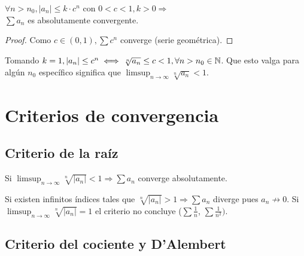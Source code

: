 \begin{corollary}
  $\forall n > n_0, |a_n| \leq k \cdot c^n$ con $0 < c < 1, k > 0 \Rightarrow$ \\
  $\sum a_n$ es absolutamente convergente.
  \begin{proof}
    Como $c \in (0, 1), \sum c^n$ converge (serie geométrica).
  \end{proof}
\end{corollary}

\begin{note}
  Tomando $k = 1, |a_n| \leq c^n \iff \sqrt[n]{a_n} \leq c < 1, \forall n > n_0 \in \mathbb{N}$. Que esto valga para algún $n_0$ específico significa que $\limsup_{n \to \infty} \sqrt[n]{a_n} < 1$.
\end{note}

\section{Criterios de convergencia}

\subsection{Criterio de la raíz}

\begin{corollary}
  Si $\limsup_{n \to \infty} \sqrt[n]{|a_n|} < 1 \Rightarrow \sum a_n$ converge absolutamente.
  \begin{note}
    Si existen infinitos índices tales que $\sqrt[n]{|a_n|} > 1 \Rightarrow \sum a_n$ diverge pues $a_n \not \to 0$.
    Si $\limsup_{n \to \infty} \sqrt[n]{|a_n|} = 1$ el criterio no concluye ($\sum \frac{1}{n}$, $\sum \frac{1}{n^2})$.
  \end{note}
\end{corollary}

\subsection{Criterio del cociente y D'Alembert}

